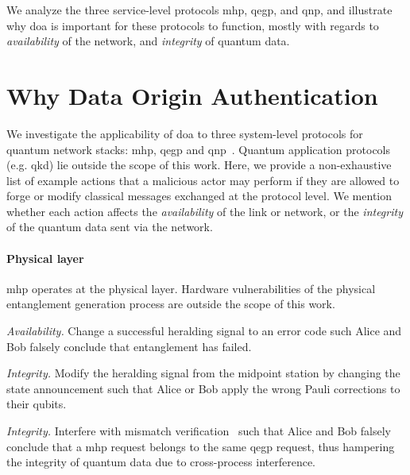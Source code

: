 We analyze the three service-level protocols \acrshort{mhp}, \acrshort{qegp}, and \acrshort{qnp},
and illustrate why \acrfull{doa} is important for these protocols to function, mostly with regards
to \emph{availability} of the network, and \emph{integrity} of quantum data.

\section{Why Data Origin Authentication}
\label{sec:doa:why}

We investigate the applicability of \acrlong{doa} to three system-level protocols for quantum
network stacks: \acrshort{mhp}, \acrshort{qegp} and \acrshort{qnp}~\cite{dahlberg_2019_egp,
kozlowski_2020_qnp}. Quantum application protocols (e.g. \acrshort{qkd}) lie outside the scope of
this work. Here, we provide a non-exhaustive list of example actions that a malicious actor may
perform if they are allowed to forge or modify classical messages exchanged at the protocol level.
We mention whether each action affects the \emph{availability} of the link or network, or the
\emph{integrity} of the quantum data sent via the network.

\paragraph{Physical layer}

\acrshort{mhp} operates at the physical layer. Hardware vulnerabilities of the physical entanglement
generation process are outside the scope of this work.

\begin{example}
\textit{Availability.}
Change a successful heralding signal to an error code such Alice and Bob falsely conclude that
entanglement has failed.
\end{example}

\begin{example}
\textit{Integrity.}
Modify the heralding signal from the midpoint station by changing the state announcement such that
Alice or Bob apply the wrong Pauli corrections to their qubits.
\end{example}

\begin{example}
\textit{Integrity.}
Interfere with mismatch verification~\cite{dahlberg_2019_egp, pompili_2022_experimental} such that
Alice and Bob falsely conclude that a \acrshort{mhp} request belongs to the same \acrshort{qegp}
request, thus hampering the integrity of quantum data due to cross-process interference.
\end{example}


